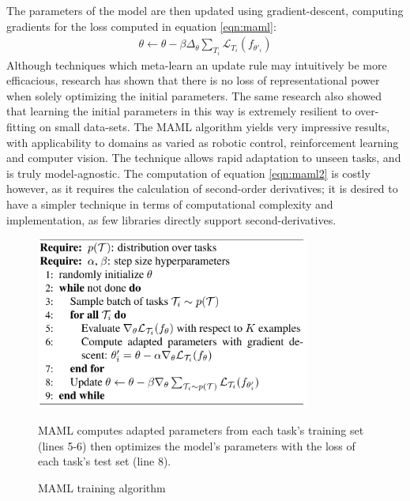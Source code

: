 \documentclass{report}
\begin{document}
The parameters of the model are then updated using gradient-descent, computing gradients for the loss computed in equation \ref{eqn:maml}:
\begin{align}
 \theta \gets \theta - \beta\Delta_\theta \sum_{T_i} \mathcal{L}_{T_{i}}(f_{\theta'_i}) \label{eqn:maml2}
\end{align}
Although techniques which meta-learn an update rule may intuitively be more efficacious, research \parencite{universality} has shown that there is no loss of representational power when solely optimizing the initial parameters. The same research also showed that learning the initial parameters in this way is extremely resilient to over-fitting on small data-sets. The MAML algorithm yields very impressive results, with applicability to domains as varied as robotic control, reinforcement learning and computer vision. The technique allows rapid adaptation to unseen tasks, and is truly model-agnostic. The computation of equation \ref{eqn:maml2} is costly however, as it requires the calculation of second-order derivatives; it is desired to have a simpler technique in terms of computational complexity and implementation, as few libraries directly support second-derivatives. \par
\begin{figure}[h]
 \centering
 \includegraphics[width=9cm]{mamlalgo}
 \caption{MAML training algorithm}
 MAML computes adapted parameters from each task's training set (lines 5-6) then optimizes the model's parameters with the loss of each task's test set (line 8).
 \label{fig:maml-algo:1}
\end{figure}
\end{document}
